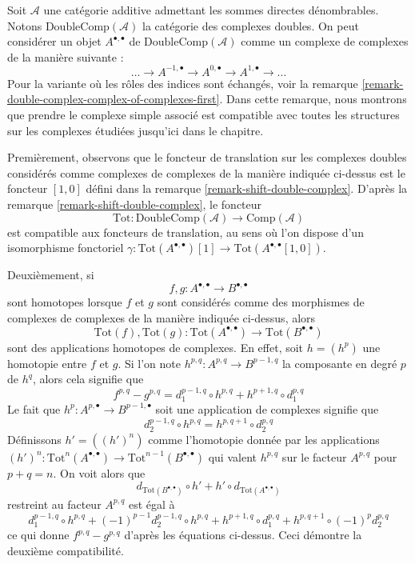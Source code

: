 \begin{remark}
\label{remark-double-complex-complex-of-complexes-second}
Soit $\mathcal{A}$ une catégorie additive admettant les sommes directes dénombrables.
Notons $\text{DoubleComp}(\mathcal{A})$ la catégorie des complexes doubles.
On peut considérer un objet $A^{\bullet, \bullet}$ de
$\text{DoubleComp}(\mathcal{A})$ comme un complexe de complexes
de la manière suivante :
$$
\ldots \to A^{-1, \bullet} \to A^{0, \bullet} \to A^{1, \bullet} \to \ldots
$$
Pour la variante où les rôles des indices sont échangés, voir la
remarque \ref{remark-double-complex-complex-of-complexes-first}.
Dans cette remarque, nous montrons que prendre le complexe simple associé
est compatible avec toutes les structures sur les complexes étudiées
jusqu'ici dans le chapitre.

\medskip\noindent
Premièrement, observons que le foncteur de translation sur les complexes doubles considérés
comme complexes de complexes de la manière indiquée ci-dessus est le foncteur
$[1, 0]$ défini dans la remarque \ref{remark-shift-double-complex}.
D'après la remarque \ref{remark-shift-double-complex}, le foncteur
$$
\text{Tot} : \text{DoubleComp}(\mathcal{A}) \to \text{Comp}(\mathcal{A})
$$
est compatible aux foncteurs de translation, au sens où l'on dispose d'un isomorphisme
fonctoriel $\gamma : \text{Tot}(A^{\bullet, \bullet})[1] \to
\text{Tot}(A^{\bullet, \bullet}[1, 0])$.

\medskip\noindent
Deuxièmement, si
$$
f, g : A^{\bullet, \bullet} \to B^{\bullet, \bullet}
$$
sont homotopes lorsque $f$ et $g$ sont considérés comme des morphismes de complexes
de complexes de la manière indiquée ci-dessus, alors
$$
\text{Tot}(f), \text{Tot}(g) :
\text{Tot}(A^{\bullet, \bullet}) \to \text{Tot}(B^{\bullet, \bullet})
$$
sont des applications homotopes de complexes. En effet, soit $h = (h^p)$
une homotopie entre $f$ et $g$. Si l'on note
$h^{p, q} : A^{p, q} \to B^{p - 1, q}$ la composante en degré $p$ de $h^q$,
alors cela signifie que
$$
f^{p, q} - g^{p, q} = d_1^{p - 1, q} \circ h^{p, q} +
h^{p + 1, q} \circ d_1^{p, q}
$$
Le fait que $h^p : A^{p, \bullet} \to B^{p - 1, \bullet}$ soit une application de
complexes signifie que
$$
d_2^{p - 1, q} \circ h^{p, q} = h^{p, q + 1} \circ d_2^{p, q}
$$
Définissons $h' = ((h')^n)$ comme l'homotopie donnée par les applications
$(h')^n : \text{Tot}^n(A^{\bullet, \bullet}) \to
\text{Tot}^{n - 1}(B^{\bullet, \bullet})$
qui valent $h^{p, q}$ sur le facteur $A^{p, q}$ pour $p + q = n$.
On voit alors que
$$
d_{\text{Tot}(B^{\bullet, \bullet})} \circ h' +
h' \circ d_{\text{Tot}(A^{\bullet, \bullet})}
$$
restreint au facteur $A^{p, q}$ est égal à
$$
d_1^{p - 1, q} \circ h^{p, q} +
(-1)^{p - 1} d_2^{p - 1, q} \circ h^{p, q} +
h^{p + 1, q} \circ d_1^{p, q} +
h^{p, q + 1} \circ (-1)^p d_2^{p, q}
$$
ce qui donne $f^{p, q} - g^{p, q}$ d'après les équations ci-dessus.
Ceci démontre la deuxième compatibilité.


\end{remark}
